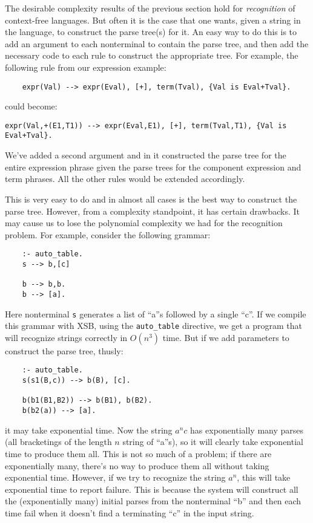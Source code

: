 The desirable complexity results of the previous section hold for {\em
recognition} of context-free languages.  But often it is the case that
one wants, given a string in the language, to construct the parse
tree(s) for it.  An easy way to do this is to add an argument to each
nonterminal to contain the parse tree, and then add the necessary code
to each rule to construct the appropriate tree.  For example, the
following rule from our expression example:
\begin{verbatim}
    expr(Val) --> expr(Eval), [+], term(Tval), {Val is Eval+Tval}.
\end{verbatim}
could become:
\begin{verbatim}
expr(Val,+(E1,T1)) --> expr(Eval,E1), [+], term(Tval,T1), {Val is Eval+Tval}.
\end{verbatim}
We've added a second argument and in it constructed the parse tree for
the entire expression phrase given the parse trees for the component
expression and term phrases.  All the other rules would be extended
accordingly.  

This is very easy to do and in almost all cases is the best way to
construct the parse tree.  However, from a complexity standpoint, it
has certain drawbacks.  It may cause us to lose the polynomial
complexity we had for the recognition problem.  For example, consider
the following grammar:
\begin{verbatim}
    :- auto_table.
    s --> b,[c]

    b --> b,b.
    b --> [a].
\end{verbatim}
Here nonterminal \verb|s| generates a list of ``a''s followed by a
single ``c''.  If we compile this grammar with XSB, using the
\verb|auto_table| directive, we get a program that will recognize
strings correctly in $O(n^3)$ time.  But if we add parameters to
construct the parse tree, thusly:
\begin{verbatim}
    :- auto_table.
    s(s1(B,c)) --> b(B), [c].

    b(b1(B1,B2)) --> b(B1), b(B2).
    b(b2(a)) --> [a].
\end{verbatim}
it may take exponential time.  Now the string $a^{n}c$ has
exponentially many parses (all bracketings of the length $n$ string of
``a''s), so it will clearly take exponential time to produce them all.
This is not so much of a problem; if there are exponentially many,
there's no way to produce them all without taking exponential time.
However, if we try to recognize the string $a^{n}$, this will take
exponential time to report failure.  This is because the system will
construct all the (exponentially many) initial parses from the
nonterminal ``b'' and then each time fail when it doesn't find a
terminating ``c'' in the input string.

